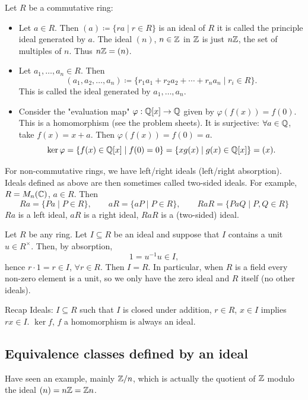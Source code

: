 \documentclass[10pt, a4paper]{article}
\begin{document}
\begin{example}
    Let $R$ be a commutative ring:
    \begin{itemize}
        \item Let $a \in R$.
        Then $(a) \coloneqq \{ra \mid r \in R\}$ is an ideal of $R$ it is called the principle ideal generated by $a$.
        The ideal $(n)$,
        $n \in \mathbb{Z}$ in $\mathbb{Z}$ is just $n\mathbb{Z}$,
        the set of multiples of $n$.
        Thus $n\mathbb{Z} = (n)$.

        \item Let $a_1, \dotsc, a_n \in R$.
        Then
        \[
        (a_1, a_2, \dotsc, a_n) \coloneqq \{r_1a_1 + r_2a_2 + \dotsi + r_na_n \mid r_i \in R\}.
        \]
        This is called the ideal generated by $a_1, \dotsc, a_n$.

        \item Consider the "evaluation map" $\varphi : \mathbb{Q}[x] \to \mathbb{Q}$ given by $\varphi(f(x)) = f(0)$.
        This is a homomorphism
        (see the problem sheets).
        It is surjective:
        $\forall a \in \mathbb{Q}$,
        take $f(x) = x + a$.
        Then $\varphi(f(x)) = f(0) = a$.
        \[
        \ker{\varphi} = \{f(x) \in \mathbb{Q}[x]\mid f(0) = 0\} = \{xg(x) \mid g(x) \in \mathbb{Q}[x]\} = (x).
        \]
    \end{itemize}
\end{example}

For non-commutative rings,
we have left/right ideals
(left/right absorption).
Ideals defined as above are then sometimes called two-sided ideals.
For example,
$R = M_n(\mathbb{C})$,
$a \in R$.
Then
\[
Ra = \{Pa \mid P \in R\},\qquad aR = \{aP \mid P \in R\},\qquad RaR = \{PaQ \mid P, Q \in R\}
\]
$Ra$ is a left ideal,
$aR$ is a right ideal,
$RaR$ is a
(two-sided)
ideal.

Let $R$ be any ring.
Let $I \subseteq R$ be an ideal and suppose that $I$ contains a unit $u \in R ^ {\times}$.
Then,
by absorption,
\[
1 = u ^ {-1}u \in I,
\]
hence $r \cdot 1 = r \in I$,
$\forall r \in R$.
Then $I = R$.
In particular,
when $R$ is a field every non-zero element is a unit,
so we only have the zero ideal  and $R$ itself
(no other ideals).

Recap Ideals:
$I \subseteq R$ such that $I$ is closed under addition,
$r \in R$,
$x \in I$ implies $rx \in I$.
$\ker{f}$,
$f$ a homomorphism is always an ideal.

\subsection{Equivalence classes defined by an ideal}
Have seen an example,
mainly $\mathbb{Z} / n$,
which is actually the quotient of $\mathbb{Z}$ modulo the ideal $(n) = n\mathbb{Z} = \mathbb{Z} n$.
\end{document}

